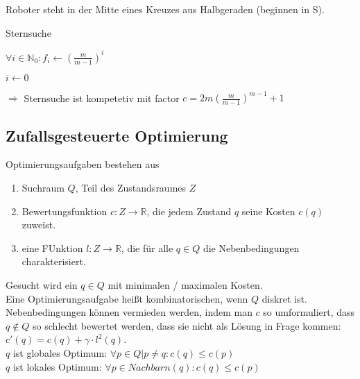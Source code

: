 Roboter steht in der Mitte eines Kreuzes aus Halbgeraden (beginnen in S).\\

\begin{algorithm}[H]
	\caption{Sternsuche}
        
        $\forall i \in \mathbb{N}_0 : f_i \leftarrow \left(\frac{m}{m-1}\right)^i$

	$i \leftarrow 0$
	
\end{algorithm}

$\Rightarrow$ Sternsuche ist kompetetiv mit factor $c = 2m \left(\frac{m}{m-1}\right)^{m-1}+1$


\subsection{Zufallsgesteuerte Optimierung}
Optimierungsaufgaben bestehen aus 
\begin{enumerate}
\item Suchraum $Q$, Teil des Zustandsraumes $Z$
\item Bewertungsfunktion $c: Z \rightarrow \mathbb{R}$, die jedem Zustand $q$ seine Kosten $c(q)$ zuweist.
\item eine FUnktion $l: Z \rightarrow \mathbb{R}$, die für alle $q \in Q$ die Nebenbedingungen charakterisiert.
\end{enumerate}
Gesucht wird ein $q \in Q$ mit minimalen / maximalen Kosten.\\
Eine Optimierungsaufgabe heißt kombinatorischen, wenn $Q$ diskret ist.\\
Nebenbedingungen können vermieden werden, indem man $c$ so umformuliert, dass
$q \not\in Q$ so schlecht bewertet werden, dass sie nicht als Lösung in Frage kommen:
$c'(q) = c(q) + \gamma \cdot l^2(q)$.\\
$q$ ist globales Optimum: $\forall p \in Q | p \ne q: c(q) \le c(p)$\\
$q$ ist lokales Optimum: $\forall p \in Nachbarn(q): c(q) \le c(p)$\\

